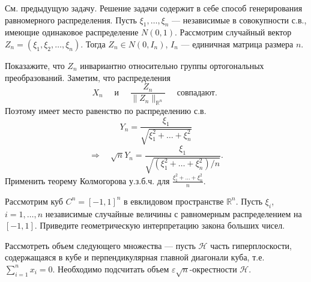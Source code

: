 \begin{ordre}

См. предыдущую задачу. Решение задачи содержит в себе способ генерирования равномерного распределения. 
Пусть $\xi_1,\ldots, \xi_n$ --- независимые в совокупности с.в., имеющие одинаковое распределение $N(0,1)$. Рассмотрим случайный вектор 
$Z_n=(\xi_1,\xi_2,\ldots,\xi_n)$. Тогда $Z_n\in N(0,I_n)$, $I_n$ --- единичная матрица размера $n$. 

Показажите, что $Z_n$ инвариантно относительно группы ортогональных преобразований. Заметим, что распределения 
$$
X_n \quad\text{ и } \quad \frac{Z_n}{\|Z_n \|_{{\mathbb R}^n}} \quad \text{ совпадают. }
$$
Поэтому имеет место равенство по распределению с.в. 
$$
Y_n=\frac{\xi_1}{\sqrt{\xi_1^2+\ldots+ \xi_n^2}} 
$$
$$
\Rightarrow \quad \sqrt{n}Y_n = \frac{\xi_1}{\sqrt{(\xi_1^2+\ldots+ \xi_n^2)/n}} . 
$$
Применить теорему Колмогорова у.з.б.ч. для $\frac{\xi_1^2+\ldots+ \xi_n^2}{n}$. 

\end{ordre}

\begin{problem}
Рассмотрим куб $C^n = [-1,1]^n$ в евклидовом пространстве $\mathbb{R}^n$. Пусть $\xi_i$, $i=1,\dots,n$ независимые случайные величины с равномерным распределением на $[-1,1]$. Приведите геометрическую интерпретацию закона больших чисел.
\end{problem}

\begin{ordre} 
Рассмотреть объем  следующего множества ---   пусть $\mathcal{H}$ часть гиперплоскости, содержащаяся в кубе и перпендикулярная главной диагонали куба, т.е.  $\sum_{i=1}^n x_i = 0$. Необходимо подсчитать объем $\varepsilon\sqrt{n}$-окрестности $\mathcal{H}$. 
\end{ordre}



